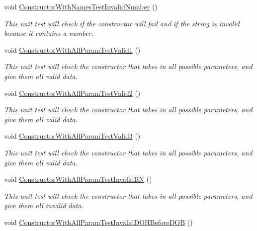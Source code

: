 \begin{DoxyCompactItemize}
void \hyperlink{class_my_all_employee_1_1_tests_1_1_contract_employee_tests_adc02331d297288a96a4783174aa1adac}{Constructor\+With\+Names\+Test\+Invalid\+Number} ()
\begin{DoxyCompactList}\small\item\em This unit test will check if the constructor will fail and if the string is invalid because it contains a number. \end{DoxyCompactList}\item 
void \hyperlink{class_my_all_employee_1_1_tests_1_1_contract_employee_tests_aee5f3ae3e5e96ffe361e64ae8bb65f95}{Constructor\+With\+All\+Param\+Test\+Valid1} ()
\begin{DoxyCompactList}\small\item\em This unit test will check the constructor that takes in all possible parameters, and give them all valid data. \end{DoxyCompactList}\item 
void \hyperlink{class_my_all_employee_1_1_tests_1_1_contract_employee_tests_a41ab4eb534ed2853f3f732d5b6716937}{Constructor\+With\+All\+Param\+Test\+Valid2} ()
\begin{DoxyCompactList}\small\item\em This unit test will check the constructor that takes in all possible parameters, and give them all valid data. \end{DoxyCompactList}\item 
void \hyperlink{class_my_all_employee_1_1_tests_1_1_contract_employee_tests_a66f164a6382d2e57057d258bb2d18542}{Constructor\+With\+All\+Param\+Test\+Valid3} ()
\begin{DoxyCompactList}\small\item\em This unit test will check the constructor that takes in all possible parameters, and give them all valid data. \end{DoxyCompactList}\item 
void \hyperlink{class_my_all_employee_1_1_tests_1_1_contract_employee_tests_ae174629fed8b90f64fe7642e88252ec6}{Constructor\+With\+All\+Param\+Test\+Invalid\+B\+N} ()
\begin{DoxyCompactList}\small\item\em This unit test will check the constructor that takes in all possible parameters, and give them all invalid data. \end{DoxyCompactList}\item 
void \hyperlink{class_my_all_employee_1_1_tests_1_1_contract_employee_tests_ab7815f00ad5071df4eb6ffc855d51e17}{Constructor\+With\+All\+Param\+Test\+Invalid\+D\+O\+H\+Before\+D\+O\+B} ()

\end{DoxyCompactItemize}

